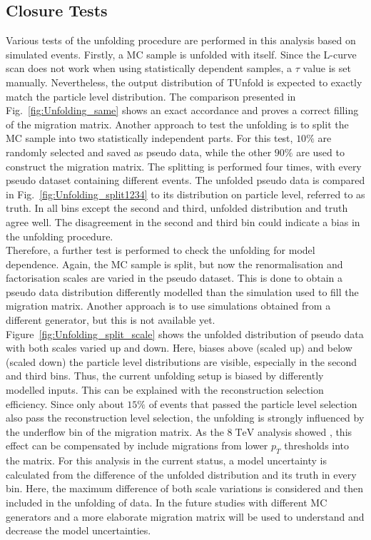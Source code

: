 	
\subsection{Closure Tests}
	Various tests of the unfolding procedure are performed in this analysis based on simulated events. Firstly, a MC sample is unfolded with itself. Since the L-curve scan does not work when using statistically dependent samples, a $\tau$ value is set manually. Nevertheless, the output distribution of TUnfold is expected to exactly match the particle level distribution. The comparison presented in Fig.~\ref{fig:Unfolding_same} shows an exact accordance and proves a correct filling of the migration matrix. Another approach to test the unfolding is to split the MC sample into two statistically independent parts. For this test, $10\%$ are randomly selected and saved as pseudo data, while the other $90\%$ are used to construct the migration matrix. The splitting is performed four times, with every pseudo dataset containing different events. The unfolded pseudo data is compared in Fig.~\ref{fig:Unfolding_split1234} to its distribution on particle level, referred to as truth. In all bins except the second and third, unfolded distribution and truth agree well. The disagreement in the second and third bin could indicate a bias in the unfolding procedure. \\
	Therefore, a further test is performed to check the unfolding for model dependence. Again, the MC sample is split, but now the renormalisation and factorisation scales are varied in the pseudo dataset. This is done to obtain a pseudo data distribution differently modelled than the simulation used to fill the migration matrix. Another approach is to use simulations obtained from a different generator, but this is not available yet. Figure~\ref{fig:Unfolding_split_scale} shows the unfolded distribution of pseudo data with both scales varied up and down. Here, biases above (scaled up) and below (scaled down) the particle level distributions are visible, especially in the second and third bins. Thus, the current unfolding setup is biased by differently modelled inputs. This can be explained with the reconstruction selection efficiency. Since only about $15\%$ of events that passed the particle level selection also pass the reconstruction level selection, the unfolding is strongly influenced by the underflow bin of the migration matrix. As the $8\;\text{TeV}$ analysis showed  \cite{torben_paper}, this effect can be compensated by include migrations from lower $p_T$ thresholds into the matrix. For this analysis in the current status, a model uncertainty is calculated from the difference of the unfolded distribution and its truth in every bin. Here, the maximum difference of both scale variations is considered and then included in the unfolding of data. In the future studies with different MC generators and a more elaborate migration matrix will be used to understand and decrease the model uncertainties.
	
